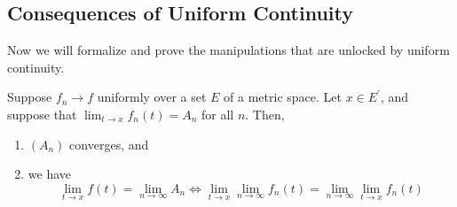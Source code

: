 \subsection{Consequences of Uniform Continuity} 

  Now we will formalize and prove the manipulations that are unlocked by uniform continuity. 

  \begin{theorem}
    Suppose $f_n \to f$ uniformly over a set $E$ of a metric space. Let $x \in E^\prime$, and suppose that $\lim_{t \to x} f_n (t) = A_n$ for all $n$. Then, 
    \begin{enumerate}
      \item $(A_n)$ converges, and 
      \item we have 
        \begin{equation}
          \lim_{t \to x} f(t) = \lim_{n \to \infty} A_n \iff \lim_{t \to x} \lim_{n \to \infty} f_n (t) = \lim_{n \to \infty} \lim_{t \to x} f_n (t)
        \end{equation}
    \end{enumerate}
  \end{theorem}
